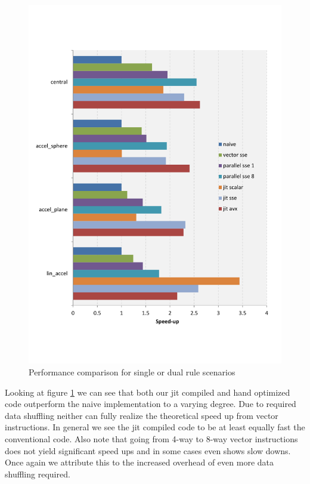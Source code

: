 \begin{figure}\centering
  \includegraphics[scale=0.6]{single_dual_rules.pdf}
  \caption{Performance comparison for single or dual rule scenarios
  \label{perf_single}}
\end{figure}

Looking at figure \ref{perf_single} we can see that both our jit compiled and hand optimized code outperform the naive implementation to a varying degree. Due to required data shuffling neither can fully realize the theoretical speed up from vector instructions. In general we see the jit compiled code to be at least equally fast the conventional code. Also note that going from 4-way to 8-way vector instructions does not yield significant speed ups and in some cases even shows slow downs. Once again we attribute this to the increased overhead of even more data shuffling required.   

